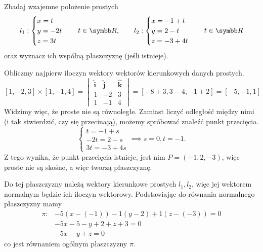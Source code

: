 \begin{example}
    Zbadaj wzajemne położenie prostych
    \[ l_1 : \begin{cases}
        x = t \\
        y = -2t \\
        z = 3t
    \end{cases} \quad t \in \RR, \qquad
    l_2 : \begin{cases}
        x = -1 + t \\
        y = 2 - t \\
        z = -3 + 4t
    \end{cases} \quad t \in \RR \]
    oraz wyznacz ich wspólną płaszczyznę (jeśli istnieje).
\end{example}
\begin{solution}
    Obliczmy najpierw iloczyn wektory wektorów kierunkowych danych prostych.
    \[ [1, -2, 3] \times [1, -1, 4] = \begin{vmatrix}
        \symbf{\hat{i}} & \symbf{\hat{j}} & \symbf{\hat{k}} \\
        1 & -2 & 3 \\
        1 & -1 & 4
    \end{vmatrix} = [-8 + 3, 3 - 4, -1 + 2] = [-5, -1, 1] \]
    Widzimy więc, że proste nie są równoległe. Zamiast liczyć odległość między nimi (i tak stwierdzić, czy się przecinają), możemy spróbować znaleźć punkt przecięcia.
    \[ \begin{cases}
        t = -1 + s \\
        -2t = 2 - s \\
        3t = -3 + 4s
    \end{cases} \implies s = 0, t = -1. \]
    Z tego wynika, że punkt przecięcia istnieje, jest nim $P = (-1, 2, -3)$, więc proste nie są skośne, a więc tworzą płaszczyznę.

    Do tej płaszczyzny należą wektory kierunkowe prostych $l_1, l_2$, więc jej wektorem normalnym będzie ich iloczyn wektorowy. Podstawiając do równania normalnego płaszczyzny mamy
    \begin{align*}
        \pi :& -5(x - (-1)) -1(y - 2) + 1(z - (-3)) = 0 \\
             & -5x - 5 - y + 2 + z + 3 = 0 \\
             & -5x - y + z = 0
    \end{align*}
    co jest równaniem ogólnym płaszczyzny $\pi$.
\end{solution}

